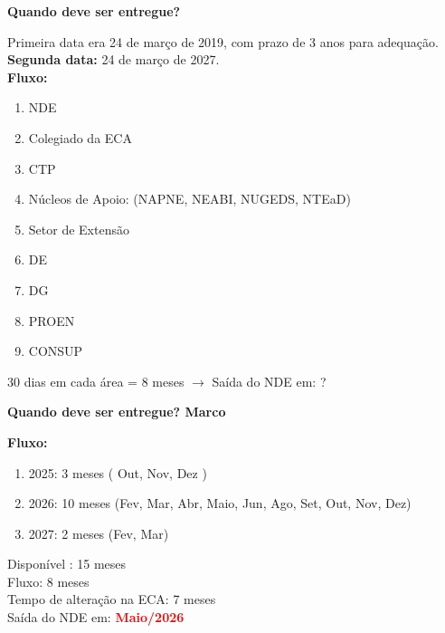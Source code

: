 \begin{frame}{\bf Quando deve ser entregue?}
	
Primeira data era 24 de março de 2019, com prazo de 3 anos para adequação.\\
\textbf{Segunda data:} 24 de março de 2027.\\

\textbf{Fluxo:}	
	\begin{enumerate} \small
		\justifying
		\item NDE
		\item Colegiado da ECA
		\item CTP
		\item Núcleos de Apoio: (NAPNE, NEABI, NUGEDS, NTEaD)
		\item Setor de Extensão
		\item DE
		\item DG
		\item PROEN
		\item CONSUP
	\end{enumerate}
	30 dias em cada área = 8 meses $\rightarrow$ Saída do NDE em: ?
\end{frame}

\begin{frame}{\bf Quando deve ser entregue? Marco}
	
	\textbf{Fluxo:}	
	\begin{enumerate} \small
		\justifying
		\item 2025: 3 meses ( Out, Nov, Dez )
		\item 2026: 10 meses (Fev, Mar, Abr, Maio, Jun, Ago, Set, Out, Nov, Dez)
		\item 2027: 2 meses (Fev, Mar)
	\end{enumerate}
	Disponível : 15 meses\\
	Fluxo: 8 meses\\
	Tempo de alteração na ECA: 7 meses\\
	
	Saída do NDE em: \textcolor{red}{\textbf{Maio/2026}}
\end{frame}

